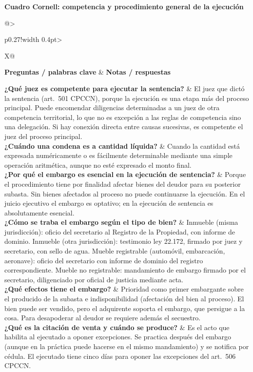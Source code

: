 \documentclass[12pt,oneside]{book}
\makeatletter
\newcommand{\cornelltitle}[1]{\par\bigskip\noindent\textbf{\sffamily Cuadro Cornell: #1}\par\nopagebreak\smallskip}
\newcommand{\cqrow}[2]{\textbf{#1} & #2 \\[0.5em]}
\newcommand{\cornellblock}[1]{%
  \noindent\begin{tabularx}{\textwidth}{@{}>{\raggedright\arraybackslash}p{0.27\textwidth}!{\vrule width 0.4pt}>{\raggedright\arraybackslash}X@{}}
  \toprule
  \textbf{Preguntas / palabras clave} & \textbf{Notas / respuestas} \\
  \midrule
  #1
  \bottomrule
  \end{tabularx}\par}
\makeatother
\begin{document}
\cornelltitle{competencia y procedimiento general de la ejecución}
\cornellblock{
\cqrow{¿Qué juez es competente para ejecutar la sentencia?}{El juez que dictó la sentencia (art.~501 CPCCN), porque la ejecución es una etapa más del proceso principal. Puede encomendar diligencias determinadas a un juez de otra competencia territorial, lo que no es excepción a las reglas de competencia sino una delegación. Si hay conexión directa entre causas sucesivas, es competente el juez del proceso principal.
}
\cqrow{¿Cuándo una condena es a cantidad líquida?}{Cuando la cantidad está expresada numéricamente o es fácilmente determinable mediante una simple operación aritmética, aunque no esté expresado el monto final.
}
\cqrow{¿Por qué el embargo es esencial en la ejecución de sentencia?}{Porque el procedimiento tiene por finalidad afectar bienes del deudor para su posterior subasta. Sin bienes afectados al proceso no puede continuarse la ejecución. En el juicio ejecutivo el embargo es optativo; en la ejecución de sentencia es absolutamente esencial.
}
\cqrow{¿Cómo se traba el embargo según el tipo de bien?}{Inmueble (misma jurisdicción): oficio del secretario al Registro de la Propiedad, con informe de dominio. Inmueble (otra jurisdicción): testimonio ley 22.172, firmado por juez y secretario, con sello de agua. Mueble registrable (automóvil, embarcación, aeronave): oficio del secretario con informe de dominio del registro correspondiente. Mueble no registrable: mandamiento de embargo firmado por el secretario, diligenciado por oficial de justicia mediante acta.
}
\cqrow{¿Qué efectos tiene el embargo?}{Prioridad como primer embargante sobre el producido de la subasta e indisponibilidad (afectación del bien al proceso). El bien puede ser vendido, pero el adquirente soporta el embargo, que persigue a la cosa. Para desapoderar al deudor se requiere además el secuestro.
}
\cqrow{¿Qué es la citación de venta y cuándo se produce?}{Es el acto que habilita al ejecutado a oponer excepciones. Se practica después del embargo (aunque en la práctica puede hacerse en el mismo mandamiento) y se notifica por cédula. El ejecutado tiene cinco días para oponer las excepciones del art.~506 CPCCN.
}
}
\medskip
\end{document}
